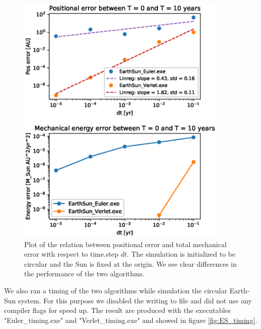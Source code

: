\documentclass[american,a4paper,12pt]{article}
\begin{document}
\begin{figure}[H]
    \centering
    \includegraphics[width =0.9\textwidth]{figures/Earth_Sun_10yr_error.eps}
    \caption{Plot of the relation between positional error and total mechanical error with respect to time.step $dt$. The simulation is initialized to be circular and the Sun is fixed at the origin. We see clear differences in the performance of the two algorithms.}
    \label{fig:ES_error}
\end{figure}
We also ran a timing of the two algorithms while simulation the circular Earth-Sun system. For this purpose we disabled the writing to file and did not use any compiler flags for speed up. The result are produced with the executables "Euler\_timing.exe" and "Verlet\_timing.exe" and showed in figure \ref{fig:ES_timing}.
\end{document}
